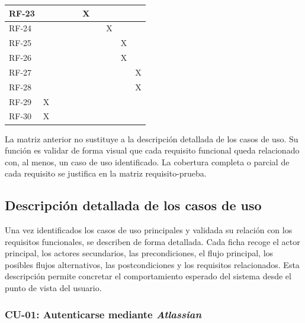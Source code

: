 {\begin{longtable}{|p{1.35cm}|c|c|c|c|c|c|c|c|c|}
RF-23 &  &  &  &  & X &  &  &  &  \\\hline
RF-24 &  &  &  &  &  &  & X &  &  \\\hline
RF-25 &  &  &  &  &  &  &  & X &  \\\hline
RF-26 &  &  &  &  &  &  &  & X &  \\\hline
RF-27 &  &  &  &  &  &  &  &  & X \\\hline
RF-28 &  &  &  &  &  &  &  &  & X \\\hline
RF-29 & X &  &  &  &  &  &  &  &  \\\hline
RF-30 & X &  &  &  &  &  &  &  &  \\\hline
\end{longtable}
\vspace{0.45em}
}

La matriz anterior no sustituye a la descripción detallada de los casos de uso. Su función es validar de forma visual que cada requisito funcional queda relacionado con, al menos, un caso de uso identificado. La cobertura completa o parcial de cada requisito se justifica en la matriz requisito-prueba.
\FloatBarrier
\subsection{Descripción detallada de los casos de uso}

Una vez identificados los casos de uso principales y validada su relación con los requisitos funcionales, se describen de forma detallada. Cada ficha recoge el actor principal, los actores secundarios, las precondiciones, el flujo principal, los posibles flujos alternativos, las postcondiciones y los requisitos relacionados. Esta descripción permite concretar el comportamiento esperado del sistema desde el punto de vista del usuario.

\clearpage
\subsubsection{CU-01: Autenticarse mediante \textit{Atlassian}}


